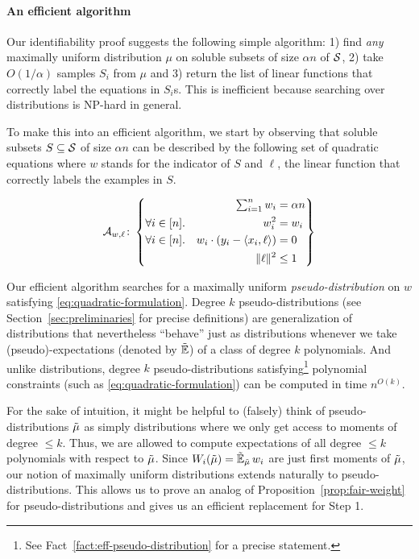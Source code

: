 \paragraph{An efficient algorithm}
Our identifiability proof suggests the following simple algorithm: 1) find \emph{any} maximally uniform distribution $\mu$ on soluble subsets of size $\alpha n$ of $\mathcal S$, 2) take $O(1/\alpha)$ samples $S_i$ from $\mu$ and 3) return the list of linear functions that correctly label the equations in $S_i$s. This is inefficient because searching over distributions is NP-hard in general.  

To make this into an efficient algorithm, we start by observing that soluble subsets $S \subseteq \mathcal S$ of size $\alpha n$ can be described by the following set of quadratic equations where $w$ stands for the indicator of $S$ and $\ell$, the linear function that correctly labels the examples in $S$. 

\begin{equation} \label{eq:quadratic-formulation}
  \cA_{w,\ell}\colon
  \left \{
    \begin{aligned}
      &&
      \textstyle\sum_{i=1}^n w_i
      &= \alpha n\\
      &\forall i\in [n].
      & w_i^2
      & =w_i \\
      &\forall i\in [n].
      & w_i \cdot (y_i - \iprod{x_i,\ell})
      & = 0\\
      &
      &\|\ell\|^2
      & \leq 1\\
    \end{aligned}
  \right \}
\end{equation} 

Our efficient algorithm searches for a maximally uniform \emph{pseudo-distribution} on $w$ satisfying \eqref{eq:quadratic-formulation}. Degree $k$ pseudo-distributions (see Section~\ref{sec:preliminaries} for precise definitions) are generalization of distributions that nevertheless ``behave'' just as distributions whenever we take (pseudo)-expectations (denoted by $\operatorname{\tilde{\mathbb{E}}}$) of a class of degree $k$ polynomials. And unlike distributions, degree $k$ pseudo-distributions satisfying\footnote{See Fact~\ref{fact:eff-pseudo-distribution} for a precise statement.} polynomial constraints (such as \eqref{eq:quadratic-formulation}) can be computed in time $n^{O(k)}$. 

For the sake of intuition, it might be helpful to (falsely) think of pseudo-distributions $\tilde{\mu}$ as simply distributions where we only get access to moments of degree $\leq k$. Thus, we are allowed to compute expectations of all degree $\leq k$ polynomials with respect to $\tilde{\mu}$. Since $W_i(\tilde{\mu}) = \operatorname{\tilde{\mathbb{E}}}_{\tilde{\mu}} w_i$ are just first moments of $\tilde{\mu}$, our notion of maximally uniform distributions extends naturally to pseudo-distributions. This allows us to prove an analog of Proposition~\ref{prop:fair-weight} for pseudo-distributions and gives us an efficient replacement for Step 1.


